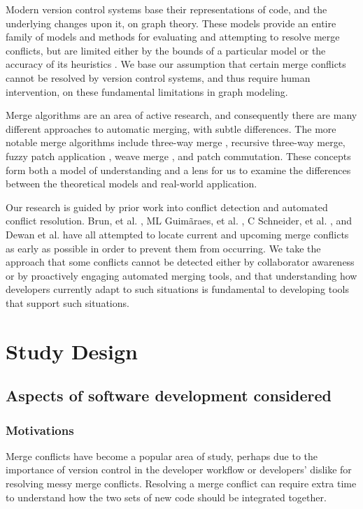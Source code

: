\documentclass{sig-alternate-05-2015}
\begin{document}
Modern version control systems base their representations of code, and the underlying changes upon it, on graph theory. These models provide an entire family of models and methods for evaluating and attempting to resolve merge conflicts, but are limited either by the bounds of a particular model or the accuracy of its heuristics \cite{ehrig15} \cite{mens99}. We base our assumption that certain merge conflicts cannot be resolved by version control systems, and thus require human intervention, on these fundamental limitations in graph modeling.

Merge algorithms are an area of active research, and consequently there are many different approaches to automatic merging, with subtle differences. The more notable merge algorithms include three-way merge \cite{livshits07}, recursive three-way merge, fuzzy patch application \cite{brunet06}, weave merge \cite{nguyen07}, and patch commutation. These concepts form both a model of understanding and a lens for us to examine the differences between the theoretical models and real-world application.

Our research is guided by prior work into conflict detection and automated conflict resolution. Brun, et al. \cite{brun11}, ML Guim\~{a}raes, et al. \cite{Guimaraes12}, C Schneider, et al. \cite{schneider04}, and Dewan et al. \cite{dewan07} have all attempted to locate current and upcoming merge conflicts as early as possible in order to prevent them from occurring. We take the approach that some conflicts cannot be detected either by collaborator awareness or by proactively engaging automated merging tools, and that understanding how developers currently adapt to such situations is fundamental to developing tools that support such situations.\\

\section{Study Design}\label{design}
\subsection{Aspects of software development considered} 
\subsubsection{Motivations}
Merge conflicts have become a popular area of study, perhaps due to the importance of version control in the developer workflow or developers' dislike for resolving messy merge conflicts. Resolving a merge conflict can require extra time to understand how the two sets of new code should be integrated together.
\end{document}
